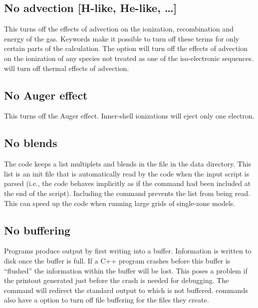 \subsection{No advection [H-like, He-like, \dots]}

This turns off the effects of advection on the ionization, recombination
and energy of the gas.
Keywords make it possible to turn off these terms
for only certain parts of the calculation.
The  option will turn
off the effects of advection on the ionization of any species not treated
as one of the iso-electronic sequences.
 will turn off thermal effects of advection.

\subsection{No Auger effect}

This turns off the Auger effect.
Inner-shell ionizations will eject only one electron.

\subsection{No blends}

The code keeps a list multiplets and blends in the file 
in the data directory. This list is an init file that is automatically read by
the code when the input script is parsed (i.e., the code behaves implicitly as
if the command  had been included at the end of
the script). Including the command  prevents the list from
being read. This can speed up the code when running large grids of single-zone
models.

\subsection{No buffering}
\label{sec:no_buffering}

Programs produce output by first writing into a buffer.
Information is written to disk once the buffer is full.
If a C++ program crashes
before this buffer is ``flushed'' the information within the buffer will
be lost.
This poses a problem if the printout generated just before the
crash is needed for debugging.
The  command will redirect the
standard output to  which is not buffered.
 commands also have
a  option to turn off file buffering
for the files they create.

